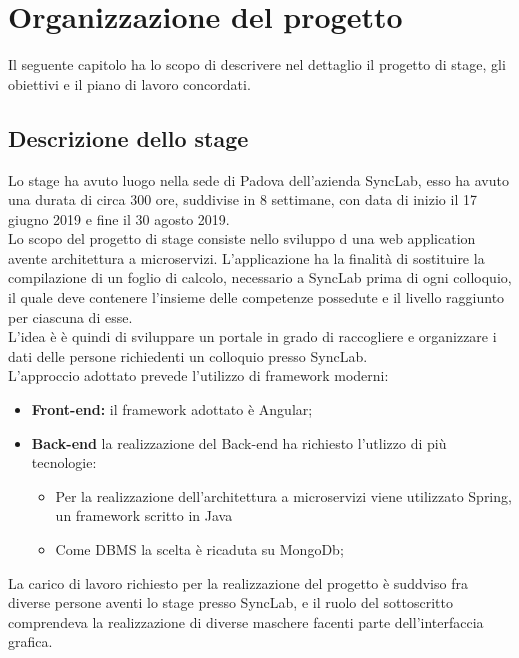 
\chapter{Organizzazione del progetto}
\label{cap:processi-metodologie}
Il seguente capitolo ha lo scopo di descrivere nel dettaglio il progetto di stage, gli obiettivi e il piano di lavoro concordati.

\section{Descrizione dello stage}
Lo stage ha avuto luogo nella sede di Padova dell'azienda SyncLab, esso ha avuto una durata di circa 300 ore, suddivise in 8 settimane, con data di inizio il 17 giugno 2019 e fine il 30 agosto 2019. \\

Lo scopo del progetto di stage consiste nello sviluppo  d  una \gls{web application} avente architettura a \gls{microservizi}.
L'applicazione ha la finalità di sostituire la compilazione di un foglio di calcolo, necessario a SyncLab prima di ogni colloquio, il quale deve contenere l'insieme delle competenze possedute e il livello raggiunto per ciascuna di esse.\\
L'idea è è quindi di sviluppare un portale in grado di raccogliere e organizzare i dati delle persone richiedenti un colloquio presso SyncLab.\\
L'approccio adottato prevede l'utilizzo di \gls{framework} moderni:

\begin{itemize}
	\item \textbf{Front-end:} il \gls{framework} adottato è \gls{Angular};
	\item \textbf{Back-end} la realizzazione del Back-end ha richiesto l'utlizzo di più tecnologie:
	\begin{itemize}
		\item Per la realizzazione dell'architettura a microservizi viene utilizzato \gls{Spring}, un framework scritto in \gls{Java}
		\item Come \gls{DBMS} la scelta è ricaduta su \gls{MongoDb};
	\end{itemize}
\end{itemize}

La carico di lavoro richiesto per la realizzazione del progetto è suddviso fra diverse persone aventi lo stage presso SyncLab, e il ruolo del sottoscritto comprendeva la realizzazione di diverse maschere facenti parte dell'interfaccia grafica.\\

